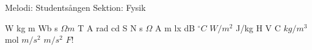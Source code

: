 \begin{song}


\begin{songmeta}
Melodi: Studentsången
Sektion: Fysik
\end{songmeta}

\begin{songtext}
W kg m Wb s
$\Omega{}m$ T A rad
cd S N s
$\Omega{}$ A m lx dB
$^{\circ}C$ $W/m^2$
J/kg
H V C
$kg/m^3$ mol
$m/s^2$
$m/s^2$
$F!$
\end{songtext}

\end{song}
